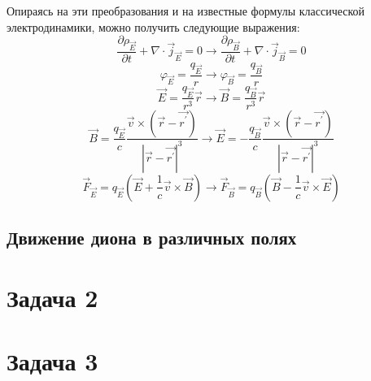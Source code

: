 \documentclass[oneside,final,14pt]{extarticle}
\begin{document}
Опираясь на эти преобразования и на известные формулы классической электродинамики, можно получить следующие выражения:
$$\frac{\partial \rho_{\vec E}}{\partial t}+\nabla\cdot\vec j_{\vec E}=0 \rightarrow \frac{\partial \rho_{\vec B}}{\partial t}+\nabla\cdot\vec j_{\vec B}=0$$
$$\varphi_{\vec E} = \frac{q_{\vec E}}{r} \rightarrow \varphi_{\vec B} = \frac{q_{\vec B}}{r} $$
$$\vec E = \frac{q_{\vec E}}{r^3}\vec r \rightarrow \vec B = \frac{q_{\vec B}}{r^3}\vec r$$
$$\vec B=\frac{q_{\vec E}}{c}\frac{\vec v \times(\vec r - \vec{ r^\prime})}{|\vec r - \vec {r^\prime}|^3} \rightarrow \vec E=-\frac{q_{\vec B}}{c}\frac{\vec v \times(\vec r - \vec{ r^\prime})}{|\vec r - \vec {r^\prime}|^3}$$
$$\vec F_{\vec E}=q_{\vec E}(\vec E + \frac{1}{c}\vec v \times \vec B) \rightarrow \vec F_{\vec B}=q_{\vec B}(\vec B - \frac{1}{c}\vec v \times \vec E)$$
	\subsection{Движение диона в различных полях}
	\newpage
	
	\section{Задача 2}
	
	\newpage
	
	\section{Задача 3}
	
	
\end{document}
